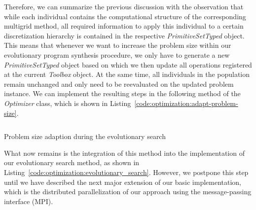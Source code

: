Therefore, we can summarize the previous discussion with the observation that while each individual contains the computational structure of the corresponding multigrid method, all required information to apply this individual to a certain discretization hierarchy is contained in the respective \emph{PrimitiveSetTyped} object.
This means that whenever we want to increase the problem size within our evolutionary program synthesis procedure, we only have to generate a new \emph{PrimitiveSetTyped} object based on which we then update all operations registered at the current \emph{Toolbox} object.
At the same time, all individuals in the population remain unchanged and only need to be reevaluated on the updated problem instance.
We can implement the resulting steps in the following method of the \emph{Optimizer} class, which is shown in Listing~\ref{code:optimization:adapt-problem-size}.
\begin{listing}
	\inputminted{python}{evostencils/optimization/adapt_problem_size.py}
	\caption{Problem size adaption during the evolutionary search}
	\label{code:optimization:adapt-problem-size}
\end{listing}
What now remains is the integration of this method into the implementation of our evolutionary search method, as shown in Listing~\ref{code:optimization:evolutionary_search}.
However, we postpone this step until we have described the next major extension of our basic implementation, which is the distributed parallelization of our approach using the message-passing interface (MPI).

